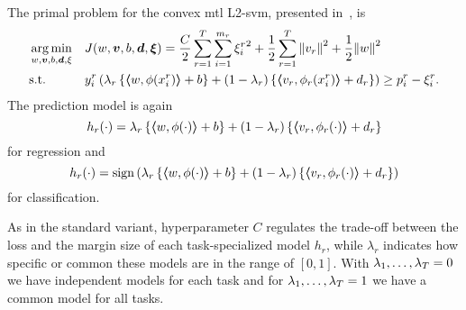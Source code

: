 The primal problem for the convex \acrshort{mtl} L2-\acrshort{svm}, presented in~\cite{RuizAD21}, is
\begin{equation}\label{eq:svmmtl_primal_convex_l2}
    \begin{aligned}
    & \argmin_{w, \fv{v}, b, \fv{d}, \xi}
    & & {J({w}, \fv{v}, b, \fv{d}, \fv{\xi}) = \frac{C}{2} \sum_{r= 1}^T \sum_{i=1}^{m_r} {\xi_{i}^r}^2 + \frac{1}{2} \sum_{r= 1}^T{\norm{{v}_r}^2} + \frac{1}{2} {\norm{{w}}}^2} \\
    & \text{s.t.}
    & & y_{i}^r \left(\lambda_r \left\lbrace \dotp{w}{\phi(x_{i}^r)} + b  \right\rbrace + (1 - \lambda_r) \left\lbrace \dotp{{v}_r}{\phi_r(x_{i}^r)} + d_r \right\rbrace  \right) \geq p_{i}^r - \xi_{i}^r .  \\
    \end{aligned}
\end{equation}
The prediction model is again
\begin{equation}
    \nonumber
    h_r(\cdot) = \lambda_r \left\lbrace \bm{\left\langle} w, \phi(\cdot) \bm{\right\rangle} + b  \right\rbrace + (1 - \lambda_r) \left\lbrace \bm{\left\langle} {v}_r, \phi_r(\cdot) \bm{\right\rangle} + d_r \right\rbrace
\end{equation}
for regression and 
\begin{equation}
    \nonumber
    h_r(\cdot) = \operatorname{sign}{ \left(\lambda_r \left\lbrace \bm{\left\langle} w, \phi(\cdot) \bm{\right\rangle} + b  \right\rbrace + (1 - \lambda_r) \left\lbrace \bm{\left\langle} {v}_r, \phi_r(\cdot) \bm{\right\rangle} + d_r \right\rbrace \right)}
\end{equation}
for classification.
%

As in the standard variant, hyperparameter $C$ regulates the trade-off between the loss and the margin size of each task-specialized model $h_r$, while $\lambda_r$ indicates how specific or common these models are in the range of $[0, 1]$. With $\lambda_1, \ldots, \lambda_T=0$ we have independent models for each task and for $\lambda_1, \ldots, \lambda_T=1$ we have a common model for all tasks. 
 


